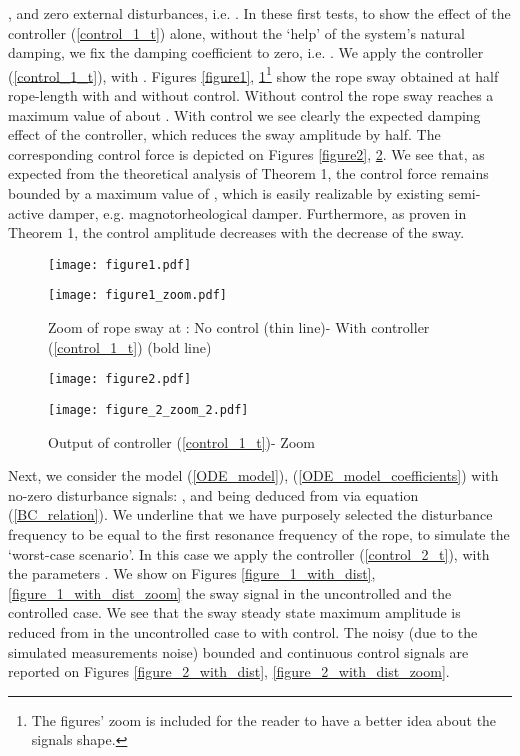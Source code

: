 \documentclass[letterpaper, 11 pt, conference]{ieeeconf}
\begin{document}
, and zero external disturbances, i.e.
. In these first tests, to show
the effect of the controller (\ref{control_1_t}) alone, without
the `help' of the system's natural damping, we fix the damping
coefficient to zero, i.e. . We apply the controller
(\ref{control_1_t}), with . Figures
\ref{figure1}, \ref{figure1_zoom}\footnote{The figures' zoom is
included for the reader to have a better idea about the signals
shape.} show the rope sway obtained at half rope-length 
with and without control. Without control the rope sway reaches a
maximum value of about . With control we see clearly the
expected damping effect of the controller, which reduces the sway
amplitude by half. The corresponding control force is depicted on
Figures \ref{figure2}, \ref{figure2_zoom}. We see that, as
expected from the theoretical analysis of Theorem 1, the control
force remains bounded by a maximum value of , which
is easily realizable by existing semi-active damper, e.g.
magnotorheological damper. Furthermore, as proven in Theorem 1,
the control amplitude decreases with the decrease of the sway.

\begin{figure}
\centering
\texttt{[image: figure1.pdf]}\vspace{-3cm}
\caption{Rope sway at : No control (thin line)- With
controller (\ref{control_1_t}) (bold line)}
\label{figure1}\vspace{-3cm}
\texttt{[image: figure1\_zoom.pdf]}\vspace{-3cm}
\caption{Zoom of rope sway at : No control (thin line)-
With controller (\ref{control_1_t}) (bold line)}
\label{figure1_zoom}
\end{figure}
\begin{figure}
\centering
\texttt{[image: figure2.pdf]}\vspace{-3cm}
\caption{Output of controller (\ref{control_1_t})} \label{figure2}
\vspace{-3cm}
\texttt{[image: figure\_2\_zoom\_2.pdf]}\vspace{-3cm}
\label{theorem3-sway-control-u-zoom} \caption{Output of controller
(\ref{control_1_t})- Zoom} \label{figure2_zoom}
\end{figure}

Next, we consider the model (\ref{ODE_model}),
(\ref{ODE_model_coefficients}) with no-zero disturbance signals:
, and  being deduced from
 via equation (\ref{BC_relation}). We underline that we
have purposely selected the disturbance frequency to be equal to
the first resonance frequency of the rope, to simulate the
`worst-case scenario'. In this case we apply the controller
(\ref{control_2_t}), with the parameters . We show on Figures
\ref{figure_1_with_dist}, \ref{figure_1_with_dist_zoom} the sway
signal in the uncontrolled and the controlled case. We see that
the sway steady state maximum amplitude is reduced from 
in the uncontrolled case to  with control. The noisy
 (due to the simulated measurements noise) bounded and continuous control signals are reported on Figures
\ref{figure_2_with_dist}, \ref{figure_2_with_dist_zoom}.
\end{document}
